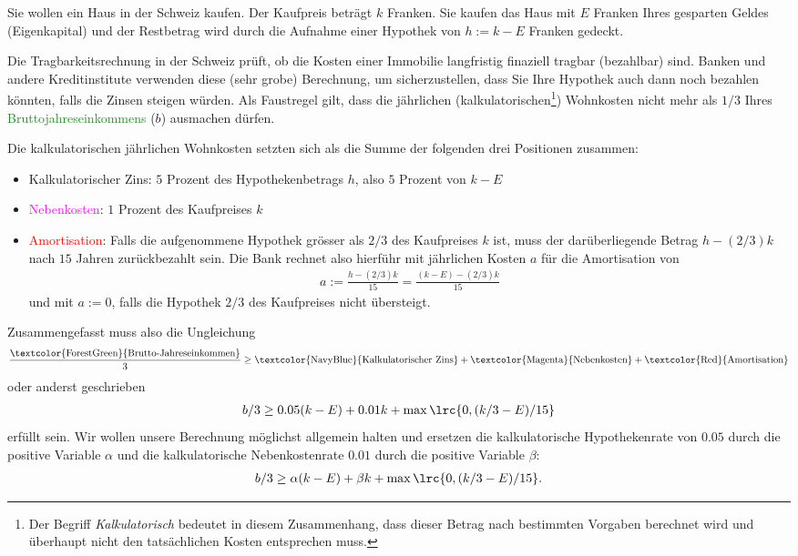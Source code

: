 \begin{myexercise}\label{myexercise:kaufpreis_haus}
	Sie wollen ein Haus in der Schweiz kaufen. Der Kaufpreis beträgt $k$ Franken. Sie kaufen das Haus mit $E$ Franken Ihres gesparten Geldes (Eigenkapital) und der Restbetrag wird durch die Aufnahme einer Hypothek von $h := k - E$ Franken gedeckt.

	Die Tragbarkeitsrechnung in der Schweiz prüft, ob die Kosten einer Immobilie langfristig finaziell tragbar (bezahlbar) sind. Banken und andere Kreditinstitute verwenden diese (sehr grobe) Berechnung, um sicherzustellen, dass Sie Ihre Hypothek auch dann noch bezahlen könnten, falls die Zinsen steigen würden. Als Faustregel gilt, dass die jährlichen (kalkulatorischen\footnote{Der Begriff \textit{Kalkulatorisch} bedeutet in diesem Zusammenhang, dass dieser Betrag nach bestimmten Vorgaben berechnet wird und überhaupt nicht den tatsächlichen Kosten entsprechen muss.}) Wohnkosten nicht mehr als $1 / 3$ Ihres \textcolor{ForestGreen}{Bruttojahreseinkommens} ($b$) ausmachen dürfen.

	Die kalkulatorischen jährlichen Wohnkosten setzten sich als die Summe der folgenden drei Positionen zusammen:
	\begin{itemize}
		\item \textcolor{NavyBlue}{Kalkulatorischer Zins}: $5$ Prozent des Hypothekenbetrags $h$, also $5$ Prozent von $k - E$
		\item \textcolor{Magenta}{Nebenkosten}: $1$ Prozent des Kaufpreises $k$
		\item \textcolor{Red}{Amortisation}: Falls die aufgenommene Hypothek grösser als $2/3$ des Kaufpreises $k$ ist, muss der darüberliegende Betrag $h - (2 / 3) k$ nach $15$ Jahren zurückbezahlt sein. Die Bank rechnet also hierführ mit jährlichen Kosten $a$ für die Amortisation von
		      \begin{align*}
			      a := \frac{h - (2 / 3) k}{15} = \frac{(k - E) - (2 / 3) k}{15}
		      \end{align*}
		      und mit $a := 0$, falls die Hypothek $2 / 3$ des Kaufpreises nicht übersteigt.
	\end{itemize}
	Zusammengefasst muss also die Ungleichung
	\begin{align*}
		\frac{\text{\textcolor{ForestGreen}{Brutto-Jahreseinkommen}}}{3} \geq \text{\textcolor{NavyBlue}{Kalkulatorischer Zins}} + \text{\textcolor{Magenta}{Nebenkosten}} + \text{\textcolor{Red}{Amortisation}}
	\end{align*}
	oder anderst geschrieben
	\begin{align*}
		b / 3 \geq 0.05(k - E) + 0.01k + \max\lrc{0, (k/3 - E) / 15}
	\end{align*}
	erfüllt sein. Wir wollen unsere Berechnung möglichst allgemein halten und ersetzen die kalkulatorische Hypothekenrate von $0.05$ durch die positive Variable $\alpha$ und die kalkulatorische Nebenkostenrate $0.01$ durch die positive Variable $\beta$:
	\begin{align}\label{eq:Ungleichung_k}
		b / 3 \geq \alpha (k - E) + \beta k + \max\lrc{0, (k/3 - E) / 15}.
	\end{align}


\end{myexercise}
